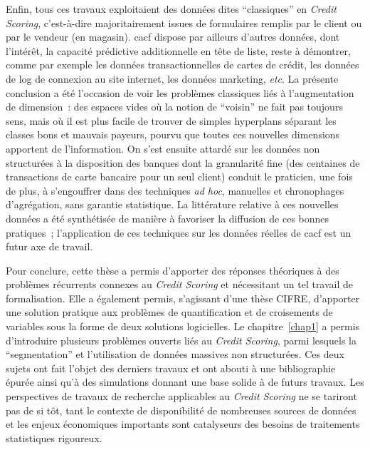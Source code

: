 \medskip

Enfin, tous ces travaux exploitaient des données dites ``classiques'' en \textit{Credit Scoring}, c'est-à-dire majoritairement issues de formulaires remplis par le client ou par le vendeur (en magasin). \gls{cacf} dispose par ailleurs d'autres données, dont l'intérêt, la capacité prédictive additionnelle en tête de liste, reste à démontrer, comme par exemple les données transactionnelles de cartes de crédit, les données de log de connexion au site internet, les données marketing, \textit{etc}. La présente conclusion a été l'occasion de voir les problèmes classiques liés à l'augmentation de dimension~: des espaces vides où la notion de ``voisin'' ne fait pas toujours sens, mais où il est plus facile de trouver de simples hyperplans séparant les classes bons et mauvais payeurs, pourvu que toutes ces nouvelles dimensions apportent de l'information. On s'est ensuite attardé sur les données non structurées à la disposition des banques dont la granularité fine (des centaines de transactions de carte bancaire pour un seul client) conduit le praticien, une fois de plus, à s'engouffrer dans des techniques \textit{ad hoc}, manuelles et chronophages d'agrégation, sans garantie statistique. La littérature relative à ces nouvelles données a été synthétisée de manière à favoriser la diffusion de ces bonnes pratiques~; l'application de ces techniques sur les données réelles de \gls{cacf} est un futur axe de travail.

\medskip

Pour conclure, cette thèse a permis d'apporter des réponses théoriques à des problèmes récurrents connexes au \textit{Credit Scoring} et nécessitant un tel travail de formalisation. Elle a également permis, s'agissant d'une thèse CIFRE, d'apporter une solution pratique aux problèmes de quantification et de croisements de variables sous la forme de deux solutions logicielles. Le chapitre~\ref{chap1} a permis d'introduire plusieurs problèmes ouverts liés au \textit{Credit Scoring}, parmi lesquels la ``segmentation'' et l'utilisation de données massives non structurées. Ces deux sujets ont fait l'objet des derniers travaux et ont abouti à une bibliographie épurée ainsi qu'à des simulations donnant une base solide à de futurs travaux. Les perspectives de travaux de recherche applicables au \textit{Credit Scoring} ne se tariront pas de si tôt, tant le contexte de disponibilité de nombreuses sources de données et les enjeux économiques importants sont catalyseurs des besoins de traitements statistiques rigoureux.

\printbibliography[heading=subbibliography, title=Références de la conclusion]